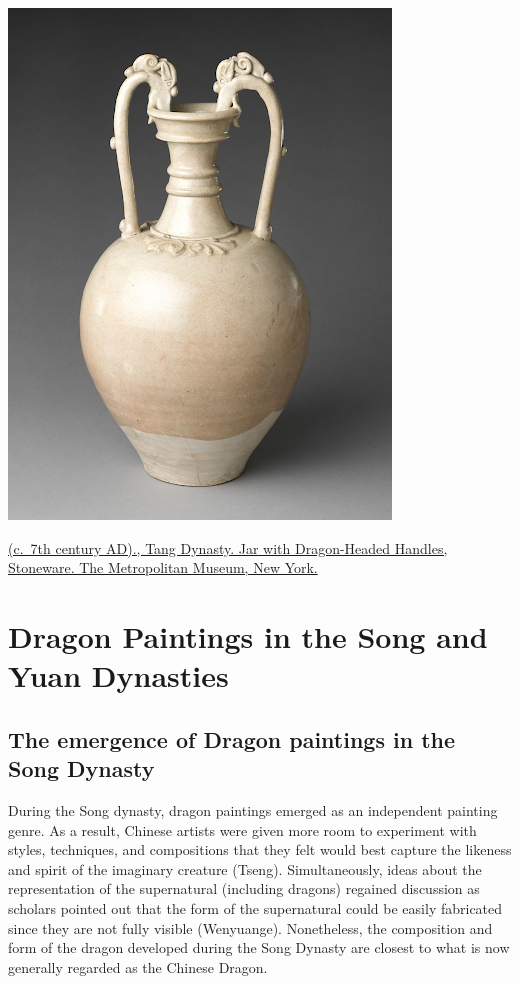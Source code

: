 \documentclass[
]{book}
\begin{document}
\includegraphics{images/jar.png}

\href{https://www.metmuseum.org/art/collection/search/45862}{(c.~7th century AD)., Tang Dynasty. Jar with Dragon-Headed Handles, Stoneware. The Metropolitan Museum, New York.}

\hypertarget{Dragon_Paintings}{%
\chapter*{Dragon Paintings in the Song and Yuan Dynasties}\label{Dragon_Paintings}}

\hypertarget{the-emergence-of-dragon-paintings-in-the-song-dynasty}{%
\section*{The emergence of Dragon paintings in the Song Dynasty}\label{the-emergence-of-dragon-paintings-in-the-song-dynasty}}

During the Song dynasty, dragon paintings emerged as an independent painting genre. As a result, Chinese artists were given more room to experiment with styles, techniques, and compositions that they felt would best capture the likeness and spirit of the imaginary creature (Tseng). Simultaneously, ideas about the representation of the supernatural (including dragons) regained discussion as scholars pointed out that the form of the supernatural could be easily fabricated since they are not fully visible (Wenyuange). Nonetheless, the composition and form of the dragon developed during the Song Dynasty are closest to what is now generally regarded as the Chinese Dragon.
\end{document}
